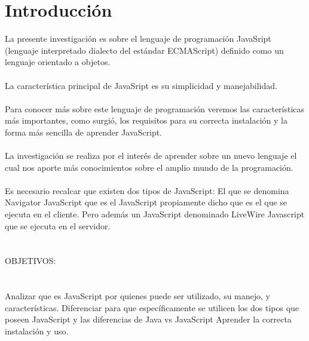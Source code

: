 \documentclass[11pt]{article} %
\begin{document}
\section{Introducción}
La presente investigación es sobre el lenguaje de programación JavaSript  (lenguaje interpretado  dialecto del estándar ECMAScript) definido como un lenguaje orientado a objetos.\\
\\La característica principal de JavaSript es su simplicidad y manejabilidad.\\
\\Para conocer más sobre este lenguaje de programación veremos las características más importantes,  como surgió, los requisitos para su correcta instalación y la forma más sencilla de aprender JavaScript. \\
\\La investigación se realiza por el interés de aprender sobre un nuevo lenguaje el cual nos aporte más conocimientos sobre el amplio mundo de la programación.\\
\\Es necesario recalcar que existen dos tipos de JavaScript: El que se denomina Navigator JavaScript que es el JavaScript propiamente dicho que es el que se ejecuta en el cliente. Pero además un JavaScript denominado LiveWire Javascript que se ejecuta en el servidor.\\
\\ \\

OBJETIVOS:
\\ \\
\\Analizar que es JavaScript por quienes puede ser utilizado, su manejo, y características.
Diferenciar para que específicamente se utilicen los dos tipos que poseen JavaScript y las diferencias de Java vs JavaScript
Aprender la correcta instalación y uso.\\\\\\
\end{document}
